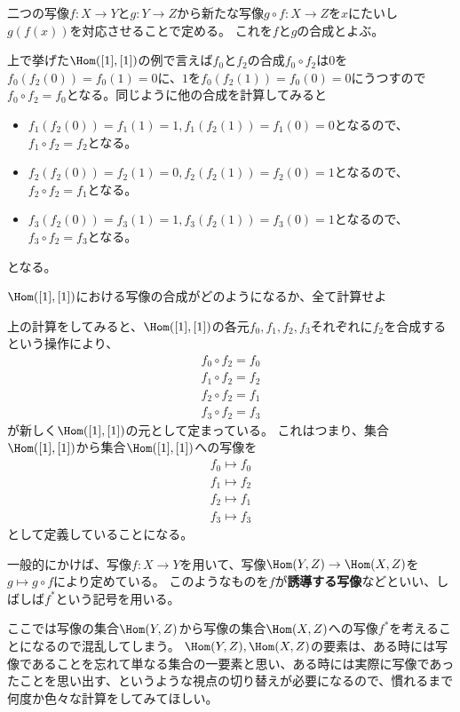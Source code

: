 \documentclass{jsarticle}
\begin{document}
\begin{dfn}[写像の合成]
二つの写像$f\colon X\to Y$と$g\colon Y\to Z$から新たな写像$g\circ f\colon X\to Z$を$x$にたいし$g(f(x))$を対応させることで定める。
これを$f$と$g$の合成とよぶ。
\end{dfn}

\begin{eg}
上で挙げた$\Hom([1],[1])$の例で言えば$f_0$と$f_2$の合成$f_0\circ f_2$は$0$を$f_0(f_2(0))=f_0(1)=0$に、$1$を$f_0(f_2(1))=f_0(0)=0$にうつすので$f_0\circ f_2=f_0$となる。同じように他の合成を計算してみると
\begin{itemize}
\item $f_1(f_2(0))=f_1(1)=1, f_1(f_2(1))=f_1(0)=0$となるので、$f_1\circ f_2=f_2$となる。
\item $f_2(f_2(0))=f_2(1)=0, f_2(f_2(1))=f_2(0)=1$となるので、$f_2\circ f_2=f_1$となる。
\item $f_3(f_2(0))=f_3(1)=1, f_3(f_2(1))=f_3(0)=1$となるので、$f_3\circ f_2=f_3$となる。
\end{itemize}
となる。
\end{eg}

\begin{prob}
$\Hom([1],[1])$における写像の合成がどのようになるか、全て計算せよ
\end{prob}

上の計算をしてみると、$\Hom([1], [1])$の各元$f_0, f_1, f_2, f_3$それぞれに$f_2$を合成するという操作により、
\begin{align*}
f_0\circ f_2=f_0\\
f_1 \circ f_2=f_2\\
f_2\circ f_2=f_1\\
f_3\circ f_2=f_3
\end{align*}
が新しく$\Hom([1], [1])$の元として定まっている。
これはつまり、集合$\Hom([1], [1])$から集合$\Hom([1], [1])$への写像を
\begin{align*}
f_0 \mapsto f_0\\
f_1 \mapsto f_2\\
f_2 \mapsto f_1\\
f_3 \mapsto f_3
\end{align*}
として定義していることになる。

一般的にかけば、写像$f:X \to Y$を用いて、写像$\Hom(Y,Z) \to \Hom(X,Z)$を$g \mapsto g \circ f$により定めている。
このようなものを$f$が\textbf{誘導する写像}などといい、しばしば$f^*$という記号を用いる。

\begin{rem}
ここでは写像の集合$\Hom(Y,Z)$から写像の集合$\Hom(X,Z)$への写像$f^*$を考えることになるので混乱してしまう。
$\Hom(Y,Z), \Hom(X,Z)$の要素は、ある時には写像であることを忘れて単なる集合の一要素と思い、ある時には実際に写像であったことを思い出す、というような視点の切り替えが必要になるので、慣れるまで何度か色々な計算をしてみてほしい。
\end{rem}
\end{document}
